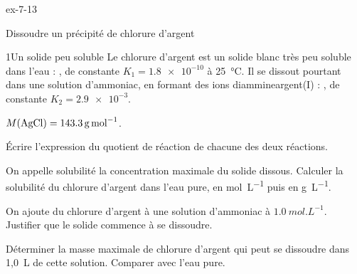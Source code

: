 \begin{blocLivre}{ex-7-13}
\begin{exercice}[3]{Dissoudre un précipité de chlorure d'argent}
\begin{docu}{1}{Un solide peu soluble}
Le chlorure d'argent est un solide blanc très peu soluble dans l'eau : ,
de constante $K_1=\num{1.8e-10}$ à 25~°C. Il se dissout pourtant dans une solution d'ammoniac, en formant des ions
diammineargent(I) : , de constante $K_2=\num{2.9e-3}$.
\end{docu}
\begin{donnees}
$M(\ce{AgCl})=\qty{143,3}{g.mol^{-1}}$.
\end{donnees}
\begin{questions}
\item Écrire l'expression du quotient de réaction de chacune des deux réactions.
\item On appelle solubilité la concentration maximale du solide dissous. Calculer la solubilité du chlorure d'argent
dans l'eau pure, en \unit{mol.L^{-1}} puis en \unit{g.L^{-1}}.
\item On ajoute du chlorure d'argent à une solution d'ammoniac à $\qty{1,0}{mol.L^{-1}}$. Justifier que le solide
commence à se dissoudre.
\item \initiative Déterminer la masse maximale de chlorure d'argent qui peut se dissoudre dans 1,0~L de cette
solution. Comparer avec l'eau pure.
\end{questions}
\end{exercice}
\end{blocLivre}
